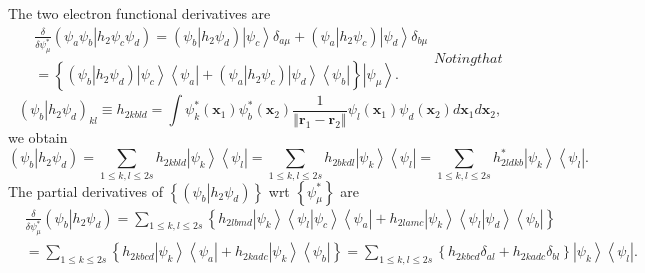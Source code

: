 \documentclass[aps,preprint]{revtex4}%
\begin{document}
The two electron functional derivatives are
\begin{subequations}
\begin{align}
&  \frac{\delta}{\delta\psi_{\mu}^{\ast}}\left(  \left.  \psi_{a}\psi
_{b}\right\vert h_{2}\psi_{c}\psi_{d}\right)  =\left(  \left.  \psi
_{b}\right\vert h_{2}\psi_{d}\right)  \left\vert \psi_{c}\right\rangle
\delta_{a\mu}+\left(  \left.  \psi_{a}\right\vert h_{2}\psi_{c}\right)
\left\vert \psi_{d}\right\rangle \delta_{b\mu}\nonumber\\
&  =\left\{  \overset{}{\left(  \left.  \psi_{b}\right\vert h_{2}\psi
_{d}\right)  \left\vert \psi_{c}\right\rangle \left\langle \psi_{a}\right\vert
+\left(  \left.  \psi_{a}\right\vert h_{2}\psi_{c}\right)  \left\vert \psi
_{d}\right\rangle \left\langle \psi_{b}\right\vert }\right\}  \left\vert
\psi_{\mu}\right\rangle . \label{2partfuncder_o}%
\end{align}
Noting that
\end{subequations}
\begin{equation}
\left(  \left.  \psi_{b}\right\vert h_{2}\psi_{d}\right)  _{kl}\equiv
h_{2kbld}=\int\psi_{k}^{\ast}\left(  \mathbf{x}_{1}\right)  \psi_{b}^{\ast
}\left(  \mathbf{x}_{2}\right)  \frac{1}{\left\Vert \mathbf{r}_{1}%
-\mathbf{r}_{2}\right\Vert }\psi_{l}\left(  \mathbf{x}_{1}\right)  \psi
_{d}\left(  \mathbf{x}_{2}\right)  d\mathbf{x}_{1}d\mathbf{x}_{2},
\end{equation}
we obtain%
\begin{equation}
\left(  \left.  \psi_{b}\right\vert h_{2}\psi_{d}\right)  =\sum_{1\leq
k,l\leq2s}h_{2kbld}\left\vert \psi_{k}\right\rangle \left\langle \psi
_{l}\right\vert =\sum_{1\leq k,l\leq2s}h_{2bkdl}\left\vert \psi_{k}%
\right\rangle \left\langle \psi_{l}\right\vert =\sum_{1\leq k,l\leq
2s}h_{2ldkb}^{\ast}\left\vert \psi_{k}\right\rangle \left\langle \psi
_{l}\right\vert .
\end{equation}
The partial derivatives of $\left\{  \left(  \left.  \psi_{b}\right\vert
h_{2}\psi_{d}\right)  \right\}  $ wrt $\left\{  \psi_{\mu}^{\ast}\right\}  $
are
\begin{align}
&  \frac{\delta}{\delta\psi_{\mu}^{\ast}}\left(  \left.  \psi_{b}\right\vert
h_{2}\psi_{d}\right)  \left.  =\right.  \sum_{1\leq k,l\leq2s}\left\{
h_{2lbmd}\left\vert \psi_{k}\right\rangle \left\langle \left.  \psi
_{l}\right\vert \psi_{c}\right\rangle \left\langle \psi_{a}\right\vert
+h_{2lamc}\left\vert \psi_{k}\right\rangle \left\langle \left.  \psi
_{l}\right\vert \psi_{d}\right\rangle \left\langle \psi_{b}\right\vert
\right\} \nonumber\\
&  \left.  =\right.  \sum_{1\leq k\leq2s}\left\{  h_{2kbcd}\left\vert \psi
_{k}\right\rangle \left\langle \psi_{a}\right\vert +h_{2kadc}\left\vert
\psi_{k}\right\rangle \left\langle \psi_{b}\right\vert \right\}  =\sum_{1\leq
k,l\leq2s}\left\{  h_{2kbcd}\delta_{al}+h_{2kadc}\delta_{bl}\right\}
\left\vert \psi_{k}\right\rangle \left\langle \psi_{l}\right\vert .
\label{2partfuncder_ex}%
\end{align}
\end{document}
